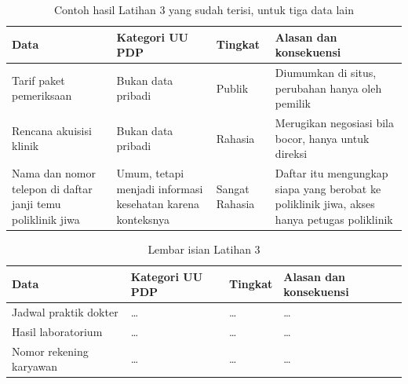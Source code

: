 \begin{table}[!htb]
  \centering
  \caption{Contoh hasil Latihan 3 yang sudah terisi, untuk tiga data lain}
  \label{tab:ch06-lat3-contoh}
  \begin{tabularx}{\textwidth}{XXlX}
    \hline
    \textbf{Data} & \textbf{Kategori UU PDP} & \textbf{Tingkat} &
      \textbf{Alasan dan konsekuensi} \\
    \hline
    Tarif paket pemeriksaan & Bukan data pribadi & Publik & Diumumkan di situs,
      perubahan hanya oleh pemilik \\
    \hline
    Rencana akuisisi klinik & Bukan data pribadi & Rahasia & Merugikan negosiasi
      bila bocor, hanya untuk direksi \\
    \hline
    Nama dan nomor telepon di daftar janji temu poliklinik jiwa & Umum, tetapi
      menjadi informasi kesehatan karena konteksnya & Sangat Rahasia & Daftar itu
      mengungkap siapa yang berobat ke poliklinik jiwa, akses hanya petugas
      poliklinik \\
    \hline
  \end{tabularx}
\end{table}

\begin{table}[!htb]
  \centering
  \caption{Lembar isian Latihan 3}
  \label{tab:ch06-lat3-hasil}
  \begin{tabularx}{\textwidth}{XXlX}
    \hline
    \textbf{Data} & \textbf{Kategori UU PDP} & \textbf{Tingkat} &
      \textbf{Alasan dan konsekuensi} \\
    \hline
    Jadwal praktik dokter & \dots & \dots & \dots \\
    \hline
    Hasil laboratorium & \dots & \dots & \dots \\
    \hline
    Nomor rekening karyawan & \dots & \dots & \dots \\
    \hline
  \end{tabularx}
\end{table}
